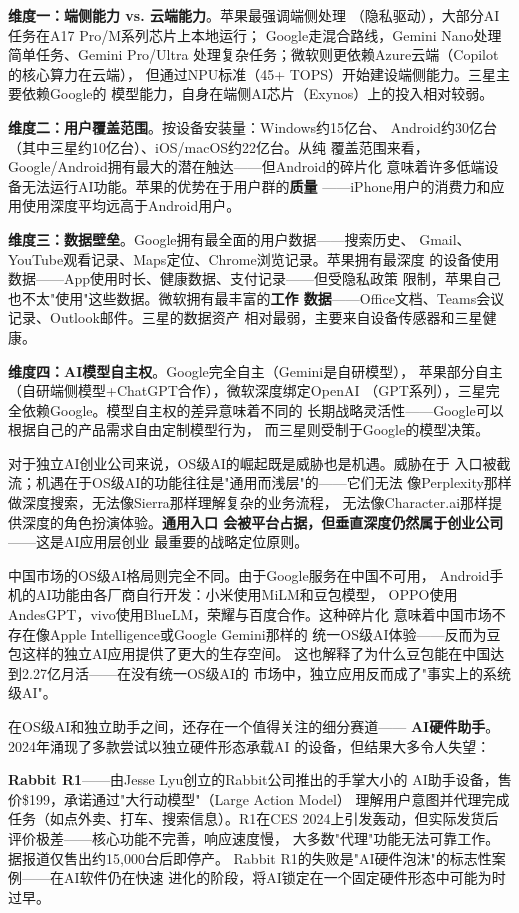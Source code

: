 \textbf{维度一：端侧能力 vs. 云端能力}。苹果最强调端侧处理
（隐私驱动），大部分AI任务在A17 Pro/M系列芯片上本地运行；
Google走混合路线，Gemini Nano处理简单任务、Gemini Pro/Ultra
处理复杂任务；微软则更依赖Azure云端（Copilot的核心算力在云端），
但通过NPU标准（45+ TOPS）开始建设端侧能力。三星主要依赖Google的
模型能力，自身在端侧AI芯片（Exynos）上的投入相对较弱。

\textbf{维度二：用户覆盖范围}。按设备安装量：Windows约15亿台、
Android约30亿台（其中三星约10亿台）、iOS/macOS约22亿台。从纯
覆盖范围来看，Google/Android拥有最大的潜在触达——但Android的碎片化
意味着许多低端设备无法运行AI功能。苹果的优势在于用户群的\textbf{质量}
——iPhone用户的消费力和应用使用深度平均远高于Android用户。

\textbf{维度三：数据壁垒}。Google拥有最全面的用户数据——搜索历史、
Gmail、YouTube观看记录、Maps定位、Chrome浏览记录。苹果拥有最深度
的设备使用数据——App使用时长、健康数据、支付记录——但受隐私政策
限制，苹果自己也不太"使用"这些数据。微软拥有最丰富的\textbf{工作
数据}——Office文档、Teams会议记录、Outlook邮件。三星的数据资产
相对最弱，主要来自设备传感器和三星健康。

\textbf{维度四：AI模型自主权}。Google完全自主（Gemini是自研模型），
苹果部分自主（自研端侧模型+ChatGPT合作），微软深度绑定OpenAI
（GPT系列），三星完全依赖Google。模型自主权的差异意味着不同的
长期战略灵活性——Google可以根据自己的产品需求自由定制模型行为，
而三星则受制于Google的模型决策。

对于独立AI创业公司来说，OS级AI的崛起既是威胁也是机遇。威胁在于
入口被截流；机遇在于OS级AI的功能往往是"通用而浅层"的——它们无法
像Perplexity那样做深度搜索，无法像Sierra那样理解复杂的业务流程，
无法像Character.ai那样提供深度的角色扮演体验。\textbf{通用入口
会被平台占据，但垂直深度仍然属于创业公司}——这是AI应用层创业
最重要的战略定位原则。

中国市场的OS级AI格局则完全不同。由于Google服务在中国不可用，
Android手机的AI功能由各厂商自行开发：小米使用MiLM和豆包模型，
OPPO使用AndesGPT，vivo使用BlueLM，荣耀与百度合作。这种碎片化
意味着中国市场不存在像Apple Intelligence或Google Gemini那样的
统一OS级AI体验——反而为豆包这样的独立AI应用提供了更大的生存空间。
这也解释了为什么豆包能在中国达到2.27亿月活——在没有统一OS级AI的
市场中，独立应用反而成了"事实上的系统级AI"。

在OS级AI和独立助手之间，还存在一个值得关注的细分赛道——
\textbf{AI硬件助手}。2024年涌现了多款尝试以独立硬件形态承载AI
的设备，但结果大多令人失望：

\textbf{Rabbit R1}——由Jesse Lyu创立的Rabbit公司推出的手掌大小的
AI助手设备，售价\$199，承诺通过"大行动模型"（Large Action Model）
理解用户意图并代理完成任务（如点外卖、打车、搜索信息）。R1在CES
2024上引发轰动，但实际发货后评价极差——核心功能不完善，响应速度慢，
大多数"代理"功能无法可靠工作。据报道仅售出约15,000台后即停产。
Rabbit R1的失败是"AI硬件泡沫"的标志性案例——在AI软件仍在快速
进化的阶段，将AI锁定在一个固定硬件形态中可能为时过早。

